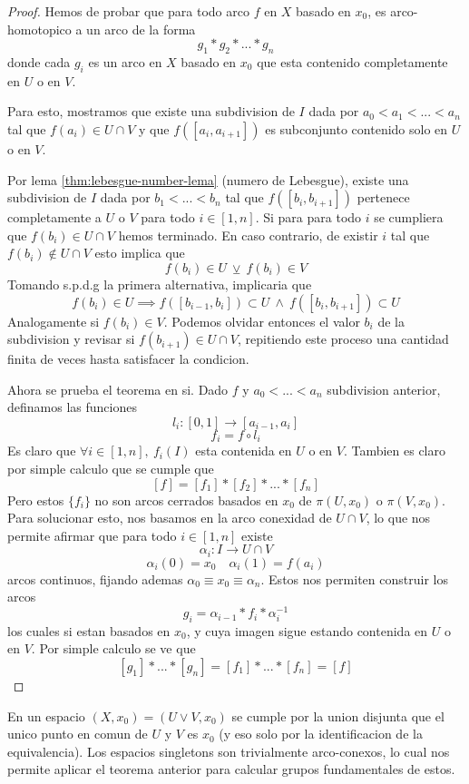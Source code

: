 \begin{proof}
  Hemos de probar que para todo arco \(f\) en \(X\) basado en \(x_0\),
  es arco-homotopico a un arco de la forma
  \[ g_1 * g_2 * ... * g_n \]
  donde cada \(g_i\) es un arco en \(X\) basado en \(x_0\) que esta
  contenido completamente en \(U\) o en \(V\).

  Para esto, mostramos que existe una subdivision de \(I\) dada por
  \(a_0 < a_1 < ... < a_n \) tal que \(f(a_i) \in U \cap V\) y que \(
  f([a_i , a_{i+1}]) \) es subconjunto contenido solo en \(U\) o en
  \(V\).

  Por lema \ref{thm:lebesgue-number-lema} (numero de Lebesgue),
  existe una subdivision de \(I\) dada por \(b_1 < ... < b_n\) tal que
  \(f ([b_i , b_{i+1}])\) pertenece completamente a \(U\) o \(V\) para
  todo \(i \in [1,n]\). Si para para todo \(i\) se cumpliera que
  \(f(b_i) \in U \cap V\) hemos terminado. En caso contrario, de existir
  \(i\) tal que \(f(b_i) \not \in U \cap V\) esto implica que
  \[ f(b_i) \in U \ \veebar \ f(b_i) \in V \]
  Tomando s.p.d.g la primera alternativa, implicaria que
  \[ f(b_i) \in U \implies f([b_{i-1}, b_{i}]) \subset U \ \land \ f([b_i,
    b_{i+1}]) \subset U \]
  Analogamente si \(f(b_i) \in V\). Podemos olvidar entonces el valor
  \(b_i\) de la subdivision y revisar si \(f(b_{i+1}) \in U \cap V\),
  repitiendo este proceso una cantidad finita de veces hasta satisfacer
  la condicion.

  Ahora se prueba el teorema en si. Dado \(f\) y \(a_0 < ... < a_n\)
  subdivision anterior, definamos las funciones
  \[ l_i : [0,1] \to [a_{i-1}, a_{i}] \]
  \[ f_i = f \circ l_i \]
  Es claro que \(\forall i \in [1, n], \ f_i (I) \) esta contenida en
  \(U\) o en \(V\). Tambien es claro por simple calculo que se cumple
  que
  \[ [f] = [f_1] * [f_2] * ... * [f_n] \]
  Pero estos \(\{f_i\}\) no son arcos cerrados basados en \(x_0\) de
  \(\pi (U,x_0)\) o \(\pi (V,x_0)\). Para solucionar esto, nos basamos
  en la arco conexidad de \(U \cap V\), lo que nos permite afirmar que
  para todo \(i \in [1 , n]\) existe
  \[ \alpha_i : I \to U \cap V \]
  \[ \alpha_i (0) = x_0 \quad \alpha_i (1) = f(a_i) \]
  arcos continuos, fijando ademas \(\alpha_0 \equiv x_0 \equiv \alpha_n
  \). Estos nos permiten construir los arcos
  \[ g_i = \alpha_{i-1} * f_i * \alpha_i^{-1} \]
  los cuales si estan basados en \(x_0\), y cuya imagen sigue estando
  contenida en \(U\) o en \(V\). Por simple calculo se ve que
  \[ [g_1] * ... * [g_n] = [f_1] * ... * [f_n] = [f] \]
\end{proof}

En un espacio \((X, x_0) = (U \vee V, x_0)\) se cumple por la union
disjunta que el unico punto en comun de \(U\) y \(V\) es \(x_0\) (y eso
solo por la identificacion de la equivalencia). Los espacios singletons
son trivialmente arco-conexos, lo cual nos permite aplicar el teorema
anterior para calcular grupos fundamentales de estos.
